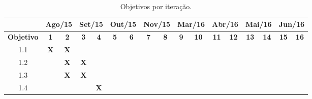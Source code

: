\begin{table}[htb!]
\centering
\caption{Objetivos por iteração.}
\label{tab:cronograma}
\begin{tabular}{c|c|c|c|c|c|c|c|c|c|c|c|c|c|c|c|c|}
\cline{2-17}
{\bf }                                & \multicolumn{2}{c|}{{\bf Ago/15}}             & \multicolumn{2}{c|}{{\bf Set/15}}             & \multicolumn{2}{c|}{{\bf Out/15}}             & \multicolumn{2}{c|}{{\bf Nov/15}}             & \multicolumn{2}{c|}{{\bf Mar/16}}             & \multicolumn{2}{c|}{{\bf Abr/16}} & \multicolumn{2}{c|}{{\bf Mai/16}} & \multicolumn{2}{c|}{{\bf Jun/16}} \\ \hline
\multicolumn{1}{|c|}{{\bf Objetivo}}  & {\bf 1}               & {\bf 2}               & {\bf 3}               & {\bf 4}               & {\bf 5}               & {\bf 6}               & {\bf 7}               & {\bf 8}               & {\bf 9}               & {\bf 10}              & {\bf 11}        & {\bf 12}        & {\bf 13}        & {\bf 14}        & {\bf 15}        & {\bf 16}        \\ \hline
\multicolumn{1}{|c|}{1.1}             & {\bf X}               & {\bf X}               &                       &                       &                       &                       &                       &                       &                       &                       &                 &                 &                 &                 &                 &                 \\ \hline
\multicolumn{1}{|c|}{1.2}             &                       & {\bf X}               & {\bf X}               &                       &                       &                       &                       &                       &                       &                       &                 &                 &                 &                 &                 &                 \\ \hline
\multicolumn{1}{|c|}{1.3}             &                       & {\bf X}               & {\bf X}               &                       &                       &                       &                       &                       &                       &                       &                 &                 &                 &                 &                 &                 \\ \hline
\multicolumn{1}{|c|}{1.4}             &                       &                       &                       & {\bf X}               &                       &                       &                       &                       &                       &                       &                 &                 &                 &                 &                 &                 \\ \hline

\end{tabular}
\end{table}
